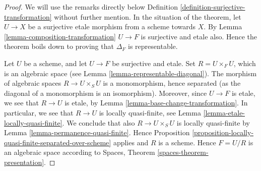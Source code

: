 \begin{proof}
We will use the remarks directly below
Definition \ref{definition-surjective-transformation}
without further mention.
In the situation of the theorem, let $U \to X$ be a surjective etale morphism
from a scheme towards $X$.
By Lemma \ref{lemma-composition-transformation}
$U \to F$ is surjective and etale also.
Hence the theorem boils down to proving that
$\Delta_F$ is representable.

\medskip\noindent
Let $U$ be a scheme, and let $U \to F$ be surjective and etale.
Set $R = U \times_F U$, which is an algebraic space (see
Lemma \ref{lemma-representable-diagonal}).
The morphism of algebraic spaces $R \to U \times_S U$ is a monomorphism,
hence separated (as the diagonal of a monomorphism is an isomorphism).
Moreover, since $U \to F$ is etale, we see that $R \to U$ is etale, by
Lemma \ref{lemma-base-change-transformation}. In particular, we see
that $R \to U$ is locally quasi-finite, see
Lemma \ref{lemma-etale-locally-quasi-finite}.
We conclude that also $R \to U \times_S U$ is
locally quasi-finite by
Lemma \ref{lemma-permanence-quasi-finite}.
Hence
Proposition \ref{proposition-locally-quasi-finite-separated-over-scheme}
applies and $R$ is a scheme. Hence $F = U/R$ is an algebraic
space according to
Spaces, Theorem \ref{spaces-theorem-presentation}.
\end{proof}











